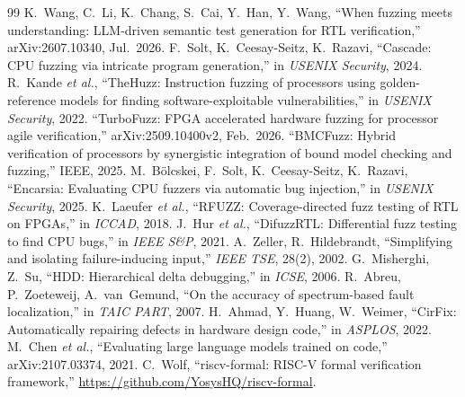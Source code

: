 \documentclass[conference,10pt]{IEEEtran}
\begin{document}
\begin{thebibliography}{99}\footnotesize
{} K.~Wang, C.~Li, K.~Chang, S.~Cai, Y.~Han, Y.~Wang, ``When fuzzing meets understanding: LLM-driven semantic test
  generation for RTL verification,'' arXiv:2607.10340, Jul.\ 2026.
 F.~Solt, K.~Ceesay-Seitz, K.~Razavi, ``Cascade: CPU fuzzing via intricate program generation,'' in \emph{USENIX Security}, 2024.
 R.~Kande \emph{et al.}, ``TheHuzz: Instruction fuzzing of processors using golden-reference models for finding
  software-exploitable vulnerabilities,'' in \emph{USENIX Security}, 2022.
 ``TurboFuzz: FPGA accelerated hardware fuzzing for processor agile verification,'' arXiv:2509.10400v2, Feb.\ 2026.
 ``BMCFuzz: Hybrid verification of processors by synergistic integration of bound model checking and fuzzing,'' IEEE, 2025.
 M.~B\"olcskei, F.~Solt, K.~Ceesay-Seitz, K.~Razavi, ``Encarsia: Evaluating CPU fuzzers via automatic bug injection,''
  in \emph{USENIX Security}, 2025.
 K.~Laeufer \emph{et al.}, ``RFUZZ: Coverage-directed fuzz testing of RTL on FPGAs,'' in \emph{ICCAD}, 2018.
 J.~Hur \emph{et al.}, ``DifuzzRTL: Differential fuzz testing to find CPU bugs,'' in \emph{IEEE S\&P}, 2021.
 A.~Zeller, R.~Hildebrandt, ``Simplifying and isolating failure-inducing input,'' \emph{IEEE TSE}, 28(2), 2002.
 G.~Misherghi, Z.~Su, ``HDD: Hierarchical delta debugging,'' in \emph{ICSE}, 2006.
 R.~Abreu, P.~Zoeteweij, A.~van~Gemund, ``On the accuracy of spectrum-based fault localization,'' in \emph{TAIC PART}, 2007.
 H.~Ahmad, Y.~Huang, W.~Weimer, ``CirFix: Automatically repairing defects in hardware design code,'' in \emph{ASPLOS}, 2022.
 M.~Chen \emph{et al.}, ``Evaluating large language models trained on code,'' arXiv:2107.03374, 2021.
 C.~Wolf, ``riscv-formal: RISC-V formal verification framework,'' \url{https://github.com/YosysHQ/riscv-formal}.
\end{thebibliography}

\appendices
\end{document}
